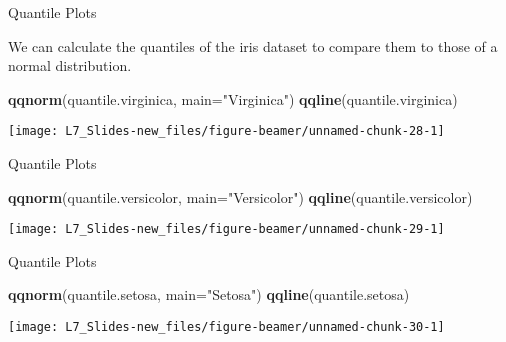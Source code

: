 \documentclass[ignorenonframetext,]{beamer}
\newenvironment{Shaded}{\begin{snugshade}}{\end{snugshade}}
\newcommand{\KeywordTok}[1]{\textcolor[rgb]{0.13,0.29,0.53}{\textbf{{#1}}}}
\newcommand{\DataTypeTok}[1]{\textcolor[rgb]{0.13,0.29,0.53}{{#1}}}
\newcommand{\StringTok}[1]{\textcolor[rgb]{0.31,0.60,0.02}{{#1}}}
\newcommand{\NormalTok}[1]{{#1}}
\begin{document}
\begin{frame}[fragile]{Quantile Plots}

We can calculate the quantiles of the iris dataset to compare them to
those of a normal distribution.

\small

\small

\begin{Shaded}
\begin{Highlighting}[]
\KeywordTok{qqnorm}\NormalTok{(quantile.virginica, }\DataTypeTok{main=}\StringTok{"Virginica"}\NormalTok{)}
\KeywordTok{qqline}\NormalTok{(quantile.virginica)}
\end{Highlighting}
\end{Shaded}

\begin{center}\texttt{[image: L7\_Slides-new\_files/figure-beamer/unnamed-chunk-28-1]} \end{center}

\end{frame}

\begin{frame}[fragile]{Quantile Plots}

\small

\begin{Shaded}
\begin{Highlighting}[]
\KeywordTok{qqnorm}\NormalTok{(quantile.versicolor, }\DataTypeTok{main=}\StringTok{"Versicolor"}\NormalTok{)}
\KeywordTok{qqline}\NormalTok{(quantile.versicolor)}
\end{Highlighting}
\end{Shaded}

\begin{center}\texttt{[image: L7\_Slides-new\_files/figure-beamer/unnamed-chunk-29-1]} \end{center}

\end{frame}

\begin{frame}[fragile]{Quantile Plots}

\small

\begin{Shaded}
\begin{Highlighting}[]
\KeywordTok{qqnorm}\NormalTok{(quantile.setosa, }\DataTypeTok{main=}\StringTok{"Setosa"}\NormalTok{)}
\KeywordTok{qqline}\NormalTok{(quantile.setosa)}
\end{Highlighting}
\end{Shaded}

\begin{center}\texttt{[image: L7\_Slides-new\_files/figure-beamer/unnamed-chunk-30-1]} \end{center}

\end{frame}
\end{document}
